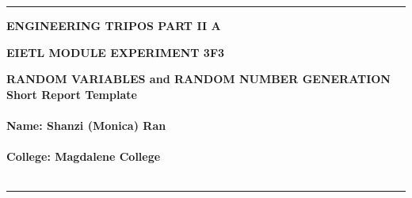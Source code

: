 \documentclass[12pt]{article}
\begin{document}
\noindent
\rule{15.7cm}{0.5mm}


\begin{center}
{\bf ENGINEERING TRIPOS PART II A}
\end{center}
\vspace{0.5cm} {\bf EIETL \hfill MODULE EXPERIMENT 3F3}
\vspace{0.5cm}
\begin{center}
{\bf RANDOM VARIABLES and RANDOM NUMBER GENERATION\\
Short  Report Template\\\hfill \\Name: Shanzi (Monica) Ran \\\hfill\\
College: Magdalene College\\\hfill
\\
}
\end{center}
\rule{15.7cm}{0.5mm}



\vspace*{1cm}
\begin{center}
\end{center}
\vspace*{1cm}
\end{document}
